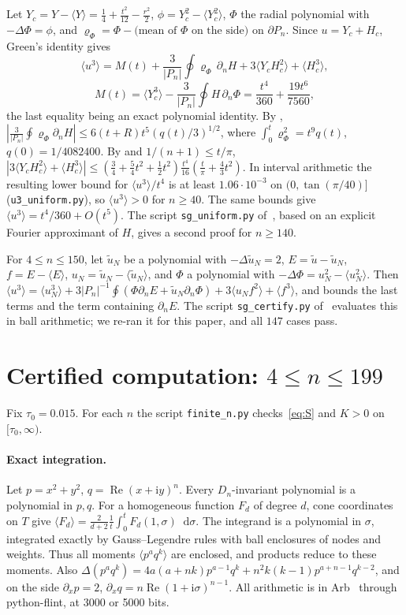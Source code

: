 \documentclass[11pt,a4paper]{report}
\DeclareRobustCommand*{\avg}[1]{\langle #1\rangle}
\DeclareRobustCommand*{\ut}{\tilde u}
\DeclareRobustCommand*{\dd}{\mathop{}\!\mathrm{d}}
\DeclareRobustCommand*{\Pg}{P_n}
\begin{document}
Let \(Y_c=Y-\avg Y=\frac14+\frac{t^2}{12}-\frac{r^2}2\), \(\phi=Y_c^2-\avg{Y_c^2}\), \(\Phi\) the radial polynomial with
\(-\Delta\Phi=\phi\), and \(\varrho_\Phi=\Phi-\text{(mean of }\Phi\text{ on the side)}\) on \(\partial\Pg\). Since \(u=Y_c+H_c\), Green's identity gives
\[
\avg{u^3}=M(t)+\frac3{|\Pg|}\oint\varrho_\Phi\,\partial_nH+3\avg{Y_cH_c^2}+\avg{H_c^3},
\]
\[
M(t)=\avg{Y_c^3}-\frac3{|\Pg|}\oint H\,\partial_n\Phi=\frac{t^4}{360}+\frac{19t^6}{7560},
\]
the last equality being an exact polynomial identity. By , \(|\frac3{|\Pg|}\oint\varrho_\Phi\partial_nH|\le6(t+R)t^5(q(t)/3)^{1/2}\), where
\(\int_0^t\varrho_\Phi^2=t^9q(t)\), \(q(0)=1/4082400\). By  and \(1/(n+1)\le t/\pi\),
\(|3\avg{Y_cH_c^2}+\avg{H_c^3}|\le(\frac34+\frac54t^2+\frac12t^2)\frac{t^4}{16}(\frac t\pi+\frac43t^2)\). In interval arithmetic the
resulting lower bound for \(\avg{u^3}/t^4\) is at least \(1.06\cdot10^{-3}\) on \((0,\tan(\pi/40)]\) (\texttt{u3\_uniform.py}), so \(\avg{u^3}>0\) for
\(n\ge40\). The same bounds give \(\avg{u^3}=t^4/360+O(t^5)\). The script \texttt{sg\_uniform.py} of~\autocite{Result14}, based on an explicit Fourier approximant of \(H\), gives a second proof for \(n\ge140\).

For \(4\le n\le150\), let \(\ut_N\) be a polynomial with \(-\Delta\ut_N=2\), \(E=\ut-\ut_N\), \(f=E-\avg E\), \(u_N=\ut_N-\avg{\ut_N}\), and
\(\Phi\) a polynomial with \(-\Delta\Phi=u_N^2-\avg{u_N^2}\). Then
\(\avg{u^3}=\avg{u_N^3}+3|\Pg|^{-1}\oint(\Phi\partial_nE+\ut_N\partial_n\Phi)+3\avg{u_Nf^2}+\avg{f^3}\), and  bounds the
last terms and the term containing \(\partial_nE\). The script \texttt{sg\_certify.py} of~\autocite{Result14} evaluates this in ball
arithmetic; we re-ran it for this paper, and all \(147\) cases pass.

\section{Certified computation: \texorpdfstring{\(4\le n\le199\)}{4 <= n <= 199}}\label{sec:finite}

Fix \(\tau_0=0.015\). For each \(n\) the script \texttt{finite\_n.py} checks~\eqref{eq:S} and \(K>0\) on \([\tau_0,\infty)\).

\paragraph{Exact integration.} Let \(p=x^2+y^2\), \(q=\operatorname{Re}(x+\mathrm iy)^n\). Every \(D_n\)-invariant polynomial is a polynomial in \(p,q\). For a
homogeneous function \(F_d\) of degree \(d\), cone coordinates on \(T\) give
\(\avg{F_d}=\frac2{d+2}\frac1t\int_0^tF_d(1,\sigma)\dd\sigma\). The integrand is a polynomial in \(\sigma\), integrated exactly by Gauss--Legendre
rules with ball enclosures of nodes and weights. Thus all moments \(\avg{p^aq^k}\) are enclosed, and products reduce to these
moments. Also \(\Delta(p^aq^k)=4a(a+nk)p^{a-1}q^k+n^2k(k-1)p^{a+n-1}q^{k-2}\), and on the side \(\partial_xp=2\),
\(\partial_xq=n\operatorname{Re}(1+\mathrm i\sigma)^{n-1}\). All arithmetic is in Arb~\autocite{Arb} through python-flint, at 3000 or 5000 bits.
\end{document}
